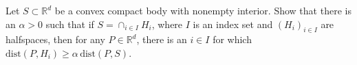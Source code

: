 Let $S \subset \mathbb{R}^d$ be a convex compact body with nonempty interior. Show that there is an $\alpha > 0$ such that if $S = \cap_{i \in I} H_i$, where $I$ is an index set and $(H_i)_{i \in I}$ are halfspaces, then for any $P \in \mathbb{R}^d$, there is an $i \in I$ for which $\mathrm{dist}(P, H_i) \ge \alpha \, \mathrm{dist}(P, S)$.